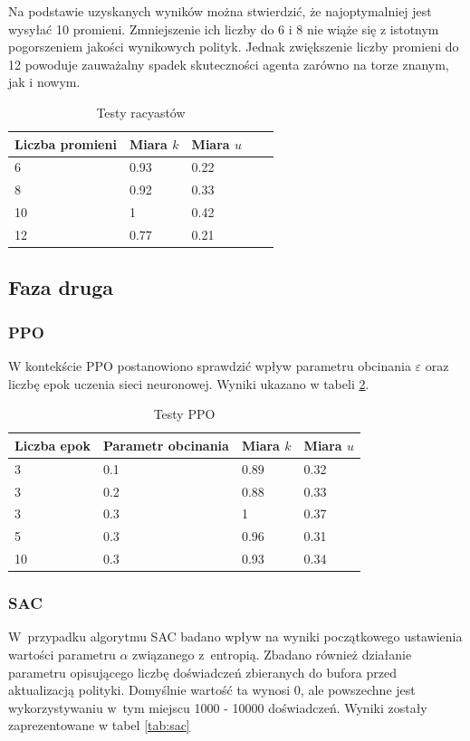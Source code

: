 \documentclass[a4paper,12pt]{article}
\begin{document}
Na podstawie uzyskanych wyników można stwierdzić, że najoptymalniej jest wysyłać 10 promieni. Zmniejszenie ich liczby do 6 i 8 nie wiąże się z istotnym pogorszeniem jakości wynikowych polityk. Jednak zwiększenie liczby promieni do 12 powoduje zauważalny spadek skuteczności agenta zarówno na torze znanym, jak i nowym.

\begin{table}[H]
	\centering
	\smallskip
	\begin{tabular}{|l|l|l|l|l|}
		\hline
		Liczba promieni & Miara $k$ & Miara $u$ \\
		\hline
		6 & 0.93 & 0.22 \\		
		8 & 0.92 & 0.33 \\		
		10 & 1 & 0.42 \\		
		12 & 0.77 & 0.21 \\\hline
	\end{tabular}
	\caption{Testy racyastów}
	\label{tab:raycast}
\end{table}


\subsection{Faza druga}
\subsubsection{PPO}
W kontekście PPO postanowiono sprawdzić wpływ parametru obcinania $\varepsilon$ oraz liczbę epok uczenia sieci neuronowej. Wyniki ukazano w tabeli \ref{tab:ppo}.

\begin{table}[H]
	\centering
	\smallskip
	\begin{tabular}{|l|l|l|l|}
		\hline
		Liczba epok & Parametr obcinania & Miara $k$ & Miara $u$ \\
		\hline
		3 & 0.1 & 0.89 & 0.32 \\		
		3 & 0.2 & 0.88 & 0.33 \\		
		3 & 0.3 & 1 & 0.37 \\		
		5 & 0.3 & 0.96 & 0.31 \\
		10 & 0.3 & 0.93 & 0.34 \\\hline
	\end{tabular}
	\caption{Testy PPO}
	\label{tab:ppo}
\end{table}

\subsubsection{SAC}
W~przypadku algorytmu SAC badano wpływ na wyniki początkowego ustawienia wartości parametru $\alpha$ związanego z~entropią. Zbadano również działanie parametru opisującego liczbę doświadczeń zbieranych do bufora przed aktualizacją polityki. Domyślnie wartość ta wynosi 0, ale powszechne jest wykorzystywaniu w~tym miejscu 1000 - 10000 doświadczeń. Wyniki zostały zaprezentowane w tabel \ref{tab:sac}
\end{document}
